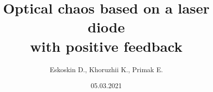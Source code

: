\documentclass[]{beamer}
\title[Optical chaos]{Optical chaos based on a laser diode \\
with positive  feedback}
\author{
Eskoskin D., 
Khoruzhii K., Primak E.}
\institute[MIPT]
\begin{document}
\date{05.03.2021}
\maketitle

















\end{document}
